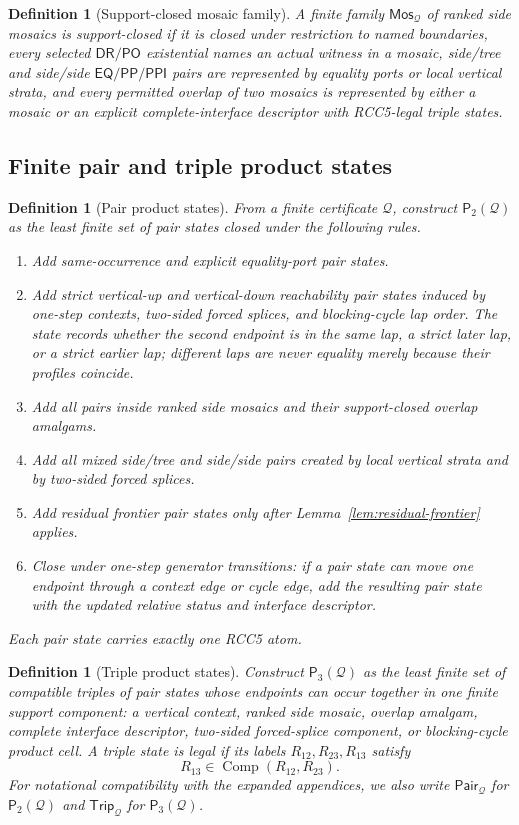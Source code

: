 \documentclass[11pt]{article}
\newtheorem{definition}[theorem]{Definition}
\newcommand{\EQ}{\mathsf{EQ}}
\newcommand{\DR}{\mathsf{DR}}
\newcommand{\PO}{\mathsf{PO}}
\newcommand{\PP}{\mathsf{PP}}
\newcommand{\PPI}{\mathsf{PPI}}
\newcommand{\comp}{\operatorname{Comp}}
\newcommand{\Q}{\mathcal Q}
\newcommand{\Mos}{\mathsf{Mos}}
\newcommand{\Pair}{\mathsf{Pair}}
\newcommand{\Trip}{\mathsf{Trip}}
\newcommand{\Pairs}{\mathsf P_2}
\newcommand{\Triples}{\mathsf P_3}
\begin{document}
\begin{definition}[Support-closed mosaic family]\label{def:support-closed}
A finite family $\Mos_\Q$ of ranked side mosaics is support-closed if it is closed under restriction to named boundaries, every selected $\DR/\PO$ existential names an actual witness in a mosaic, side/tree and side/side $\EQ/\PP/\PPI$ pairs are represented by equality ports or local vertical strata, and every permitted overlap of two mosaics is represented by either a mosaic or an explicit complete-interface descriptor with RCC5-legal triple states.
\end{definition}

\subsection{Finite pair and triple product states}

\begin{definition}[Pair product states]\label{def:pair-product}
From a finite certificate $\Q$, construct $\Pairs(\Q)$ as the least finite set of pair states closed under the following rules.
\begin{enumerate}[label=(P\arabic*)]
\item Add same-occurrence and explicit equality-port pair states.
\item Add strict vertical-up and vertical-down reachability pair states induced by one-step contexts, two-sided forced splices, and blocking-cycle lap order.  The state records whether the second endpoint is in the same lap, a strict later lap, or a strict earlier lap; different laps are never equality merely because their profiles coincide.
\item Add all pairs inside ranked side mosaics and their support-closed overlap amalgams.
\item Add all mixed side/tree and side/side pairs created by local vertical strata and by two-sided forced splices.
\item Add residual frontier pair states only after Lemma~\ref{lem:residual-frontier} applies.
\item Close under one-step generator transitions: if a pair state can move one endpoint through a context edge or cycle edge, add the resulting pair state with the updated relative status and interface descriptor.
\end{enumerate}
Each pair state carries exactly one RCC5 atom.
\end{definition}

\begin{definition}[Triple product states]\label{def:triple-product}
Construct $\Triples(\Q)$ as the least finite set of compatible triples of pair states whose endpoints can occur together in one finite support component: a vertical context, ranked side mosaic, overlap amalgam, complete interface descriptor, two-sided forced-splice component, or blocking-cycle product cell.  A triple state is legal if its labels $R_{12},R_{23},R_{13}$ satisfy
\[
   R_{13}\in\comp(R_{12},R_{23}).
\]
For notational compatibility with the expanded appendices, we also write $\Pair_\Q$ for $\Pairs(\Q)$ and $\Trip_\Q$ for $\Triples(\Q)$.
\end{definition}
\end{document}
